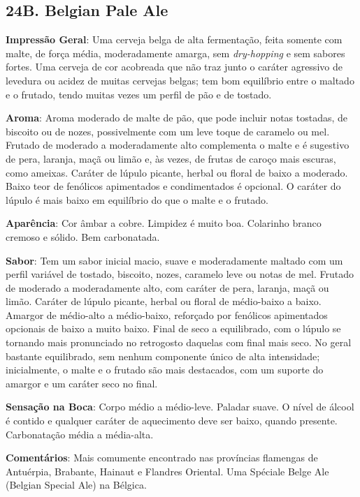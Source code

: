 \subsection*{24B. Belgian Pale Ale}
\textbf{Impressão Geral}: Uma cerveja belga de alta fermentação, feita somente com malte, de força média, moderadamente amarga, sem \textit{dry-hopping} e sem sabores fortes. Uma cerveja de cor acobreada que não traz junto o caráter agressivo de levedura ou acidez de muitas cervejas belgas; tem bom equilíbrio entre o maltado e o frutado, tendo muitas vezes um perfil de pão e de tostado.

\textbf{Aroma}: Aroma moderado de malte de pão, que pode incluir notas tostadas, de biscoito ou de nozes, possivelmente com um leve toque de caramelo ou mel. Frutado de moderado a moderadamente alto complementa o malte e é sugestivo de pera, laranja, maçã ou limão e, às vezes, de frutas de caroço mais escuras, como ameixas. Caráter de lúpulo picante, herbal ou floral de baixo a moderado. Baixo teor de fenólicos apimentados e condimentados é opcional. O caráter do lúpulo é mais baixo em equilíbrio do que o malte e o frutado.

\textbf{Aparência}: Cor âmbar a cobre. Limpidez é muito boa. Colarinho branco cremoso e sólido. Bem carbonatada.

\textbf{Sabor}: Tem um sabor inicial macio, suave e moderadamente maltado com um perfil variável de tostado, biscoito, nozes, caramelo leve ou notas de mel. Frutado de moderado a moderadamente alto, com caráter de pera, laranja, maçã ou limão. Caráter de lúpulo picante, herbal ou floral de médio-baixo a baixo. Amargor de médio-alto a médio-baixo, reforçado por fenólicos apimentados opcionais de baixo a muito baixo. Final de seco a equilibrado, com o lúpulo se tornando mais pronunciado no retrogosto daquelas com final mais seco. No geral bastante equilibrado, sem nenhum componente único de alta intensidade; inicialmente, o malte e o frutado são mais destacados, com um suporte do amargor e um caráter seco no final.

\textbf{Sensação na Boca}: Corpo médio a médio-leve. Paladar suave. O nível de álcool é contido e qualquer caráter de aquecimento deve ser baixo, quando presente. Carbonatação média a média-alta.

\textbf{Comentários}: Mais comumente encontrado nas províncias flamengas de Antuérpia, Brabante, Hainaut e Flandres Oriental. Uma Spéciale Belge Ale (Belgian Special Ale) na Bélgica.

